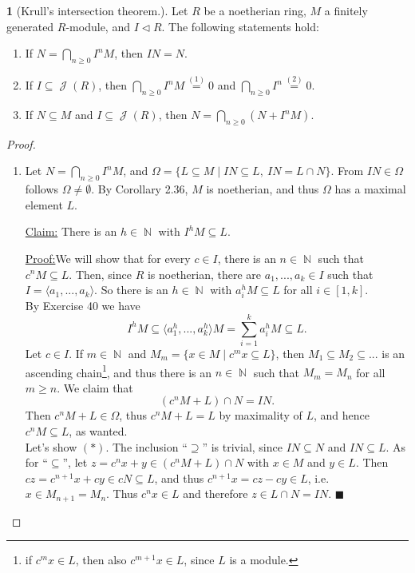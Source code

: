\documentclass[12pt,a4paper]{report}
\theoremstyle{definition}
\theoremstyle{num.custom-title}
\newtheorem{teo_custom-title}[theorem]{} %
\newenvironment{claim}[1]{\par\noindent\underline{Claim#1:}\space}{} %
\newenvironment{claimproof}[1]{\par\noindent\underline{Proof:}\space#1}{\leavevmode\unskip\penalty9999 \hbox{}\nobreak\hfill\quad\hbox{$\blacksquare$}} %
\DeclareMathOperator{\J}{\mathcal{J}}
\DeclareMathOperator{\N}{\mathbb{N}}
\DeclareMathOperator{\sse}{\subseteq}
\begin{document}
\begin{teo_custom-title}[Krull's intersection theorem.]
Let $R$ be a noetherian ring, $M$ a finitely generated $R$-module, and $I \lhd R$. The following statements hold:
\begin{enumerate}
\item If $N = \displaystyle\bigcap_{n \geq 0} I^n M$, then $I N = N$.
\item If $I \sse \J(R)$, then $\displaystyle\bigcap_{n \geq 0} I^n M \stackrel{(1)}{=} 0$ and $\displaystyle\bigcap_{n \geq 0} I^n \stackrel{(2)}{=} 0$.
\item If $N \sse M$ and $I \sse \J(R)$, then $N = \displaystyle\bigcap_{n \geq 0} (N + I^n M)$.
\end{enumerate}
\begin{proof}\ 
\begin{enumerate}
\item Let $N=\bigcap_{n \geq 0} I^n M$, and $\Omega = \{L \sse M \mid IN \sse L, \ IN=L \cap N \}$. From $IN \in \Omega$ follows $\Omega \neq \emptyset$. By Corollary 2.36, $M$ is noetherian, and thus $\Omega$ has a maximal element $L$.
\begin{claim}{}
There is an $h \in \N$ with $I^h M \sse L$.
\begin{claimproof}
We will show that for every $c \in I$, there is an $n \in \N$ such that $c^n M \sse L$. Then, since $R$ is noetherian, there are $a_1,...,a_k \in I$ such that $I = \langle a_1,...,a_k \rangle$. So there is an $h \in \N$ with $a_i^h M \sse L$ for all $i \in [1,k]$.\\
By Exercise 40 we have 
\[
I^h M \sse \langle a_1^h,...,a_k^h \rangle M = \sum_{i=1}^k a_i^h M \sse L.
\]
Let $c \in I$. If $m \in \N$ and $M_m = \{x \in M \mid c^m x \sse L\}$, then $M_1 \sse M_2 \sse ...$ is an ascending chain\footnote{if $c^m x \in L$, then also $c^{m+1}x \in L$, since $L$ is a module.}, and thus there is an $n \in \N$ such that $M_m = M_n$ for all $m \geq n$. We claim that
\[
(c^n M + L) \cap N = IN. \tag{$*$}
\]
Then $c^n M + L \in \Omega$, thus $c^n M + L= L$ by maximality of $L$, and hence $c^n M \sse L$, as wanted.\\
Let's show $(*)$. The inclusion ``$\supseteq$'' is trivial, since $IN \sse N$ and $IN \sse L$. As for ``$\sse$'', let $z = c^n x + y \in (c^n M + L) \cap N$ with $x \in M$ and $y \in L$. Then $c z = c^{n+1} x + cy \in cN \sse L$, and thus $c^{n+1}x = cz - cy \in L$, i.e. $x \in M_{n+1} = M_n$. Thus $c^n x \in L$ and therefore $z \in L \cap N = IN$.
\end{claimproof}

\end{claim}
\end{enumerate}
\end{proof}
\end{teo_custom-title}
\end{document}
